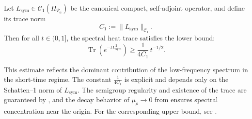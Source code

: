 \begin{lemma}
\label{lem:hk_lower_bound}
Let \( L_{\mathrm{sym}} \in \mathcal{C}_1(H_{\Psi_\alpha}) \) be the canonical compact, self-adjoint operator, and define its trace norm
\[
C_1 := \| L_{\mathrm{sym}} \|_{\mathcal{C}_1}.
\]
Then for all \( t \in (0,1] \), the spectral heat trace satisfies the lower bound:
\[
\operatorname{Tr}\left( e^{-t L_{\mathrm{sym}}^2} \right) \ge \frac{1}{4C_1} \, t^{-1/2}.
\]

\medskip
\noindent
This estimate reflects the dominant contribution of the low-frequency spectrum in the short-time regime. The constant \( \frac{1}{4C_1} \) is explicit and depends only on the Schatten–1 norm of \( L_{\mathrm{sym}} \). The semigroup regularity and existence of the trace are guaranteed by , and the decay behavior of \( \mu_\rho \to 0 \) from  ensures spectral concentration near the origin. For the corresponding upper bound, see .
\end{lemma}
